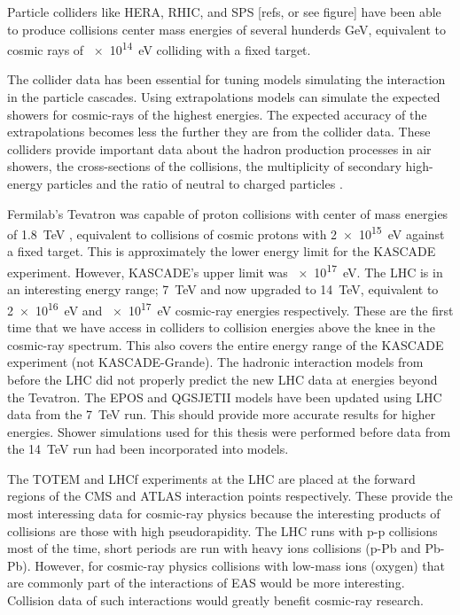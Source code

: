 Particle colliders like HERA, RHIC, and SPS [refs, or see figure] have been able to produce collisions center mass energies of several hunderds \si{\GeV}, equivalent to cosmic rays of \SI{e14}{\eV} colliding with a fixed target.

The collider data has been essential for tuning models simulating the interaction in the particle cascades. Using extrapolations models can simulate the expected showers for cosmic-rays of the highest energies. The expected accuracy of the extrapolations becomes less the further they are from the collider data. These colliders provide important data about the hadron production processes in air showers, the cross-sections of the collisions, the multiplicity of secondary high-energy particles and the ratio of neutral to charged particles \cite{pierog2008lhc}.

Fermilab's Tevatron was capable of proton collisions with center of mass energies of \SI{1.8}{\TeV} \cite{abe1994tevatron}, equivalent to collisions of cosmic protons with \SI{2e15}{\eV} against a fixed target. This is approximately the lower energy limit for the KASCADE experiment. However, KASCADE's upper limit was \SI{e17}{\eV}. The LHC is in an interesting energy range; \SI{7}{\TeV} and now upgraded to \SI{14}{\TeV}, equivalent to \SI{2e16}{\eV} and \SI{e17}{\eV} cosmic-ray energies respectively. These are the first time that we have access in colliders to collision energies above the knee in the cosmic-ray spectrum. This also covers the entire energy range of the KASCADE experiment (not KASCADE-Grande). The hadronic interaction models from before the LHC did not properly predict the new LHC data at energies beyond the Tevatron. The EPOS and QGSJETII models have been updated using LHC data from the \SI{7}{\TeV} run. This should provide more accurate results for higher energies. Shower simulations used for this thesis were performed before data from the \SI{14}{\TeV} run had been incorporated into models.

The TOTEM and LHCf experiments at the LHC are placed at the forward regions of the CMS and ATLAS interaction points respectively. These provide the most interessing data for cosmic-ray physics because the interesting products of collisions are those with high pseudorapidity. The LHC runs with p-p collisions most of the time, short periods are run with heavy ions collisions (p-Pb and Pb-Pb). However, for cosmic-ray physics collisions with low-mass ions (oxygen) that are commonly part of the interactions of EAS would be more interesting. Collision data of such interactions would greatly benefit cosmic-ray research.

